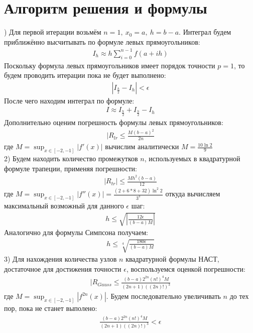 \documentclass[10pt]{scrartcl}
\begin{document}
\section*{Алгоритм решения и формулы}) Для первой итерации возьмём $n = 1, \ x_0 = a, \ h = b - a$. Интеграл будем приближённо высчитывать по 
формуле левых прямоугольников:
\begin{gather*}
I_h \approx h \sum_{i = 0}^{n - 1} f(a + ih)
\end{gather*}
Поскольку формула левых прямоугольников имеет порядок точности $p = 1$, то будем проводить итерации пока не
будет выполнено:
\begin{gather*}
|I_{\frac{h}{2}} - I_h| < \epsilon
\end{gather*}
После чего находим интеграл по формуле:
\begin{gather*}
I \approx I_{\frac{h}{2}} + I_{\frac{h}{2}} - I_h
\end{gather*}
Дополнительно оценим погрешность формулы левых прямоугольников:
\begin{gather*}
|R_{lr} \leq \frac{M(b - a)^2}{2n}
\end{gather*}
где $M = \sup_{x \in [-2, -1]}|f'(x)|$ вычислим аналитически $M = \frac{10\ln 2}{9}$\\
2) Будем находить количество промежутков $n$, используемых в квадратурной формуле трапеции, применяя 
погрешности:
\begin{gather*}
|R_{tr}| \leq \frac{Mh^2(b - a)}{12}
\end{gather*}
где $M = \sup_{x \in [-2, -1]} |f''(x)| = \frac{(2 + 6 * 8 + 32)\ln^2 2}{3^3}$
откуда вычисляем максимальный возможный для данного $\epsilon$ шаг:
\begin{gather*}
h \leq \sqrt{|\frac{12\epsilon}{(b - a)M}|}
\end{gather*}
Аналогично для формулы Симпсона получаем:
\begin{gather*}
h \leq \sqrt[4]{\frac{180\epsilon}{(b - a)M}}
\end{gather*}
3) Для нахождения количества узлов $n$ квадратурной формулы НАСТ, достаточное для достижения точности 
$\epsilon$, воспользуемся оценкой погрешности:
\begin{gather*}
|R_{Gauss} \leq \frac{(b - a)2^{2n}(n!)^4 M}{(2n+1)((2n)!)^3}
\end{gather*}
где $M = \sup_{x \in [-2, -1]}|f^{2n}(x)|$. Будем последовательно увеличивать $n$ до тех пор, пока не станет
выполено:
\begin{gather*}
\frac{(b - a)2^{2n}(n!)^4 M}{(2n+1)((2n)!)^3} < \epsilon
\end{gather*}
\end{document}
